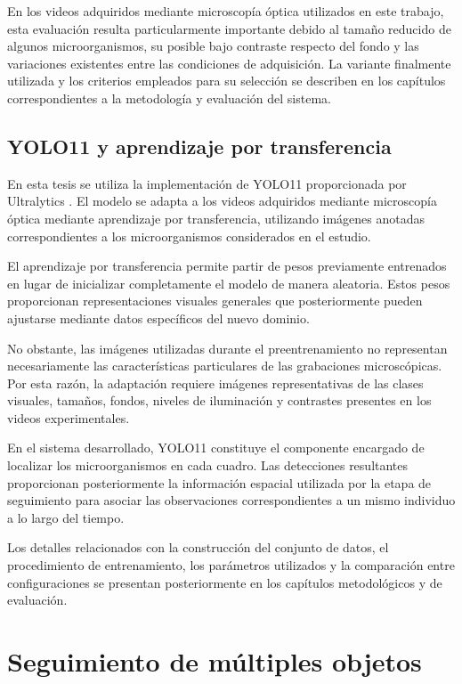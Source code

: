 En los videos adquiridos mediante microscopía óptica utilizados en este trabajo, esta evaluación resulta particularmente importante debido al tamaño reducido de algunos microorganismos, su posible bajo contraste respecto del fondo y las variaciones existentes entre las condiciones de adquisición. La variante finalmente utilizada y los criterios empleados para su selección se describen en los capítulos correspondientes a la metodología y evaluación del sistema.

\subsection{YOLO11 y aprendizaje por transferencia}

En esta tesis se utiliza la implementación de YOLO11 proporcionada por Ultralytics \cite{jocher2024}. El modelo se adapta a los videos adquiridos mediante microscopía óptica mediante aprendizaje por transferencia, utilizando imágenes anotadas correspondientes a los microorganismos considerados en el estudio.

El aprendizaje por transferencia permite partir de pesos previamente entrenados en lugar de inicializar completamente el modelo de manera aleatoria. Estos pesos proporcionan representaciones visuales generales que posteriormente pueden ajustarse mediante datos específicos del nuevo dominio.

No obstante, las imágenes utilizadas durante el preentrenamiento no representan necesariamente las características particulares de las grabaciones microscópicas. Por esta razón, la adaptación requiere imágenes representativas de las clases visuales, tamaños, fondos, niveles de iluminación y contrastes presentes en los videos experimentales.

En el sistema desarrollado, YOLO11 constituye el componente encargado de localizar los microorganismos en cada cuadro. Las detecciones resultantes proporcionan posteriormente la información espacial utilizada por la etapa de seguimiento para asociar las observaciones correspondientes a un mismo individuo a lo largo del tiempo.

Los detalles relacionados con la construcción del conjunto de datos, el procedimiento de entrenamiento, los parámetros utilizados y la comparación entre configuraciones se presentan posteriormente en los capítulos metodológicos y de evaluación.

\section{Seguimiento de múltiples objetos}

